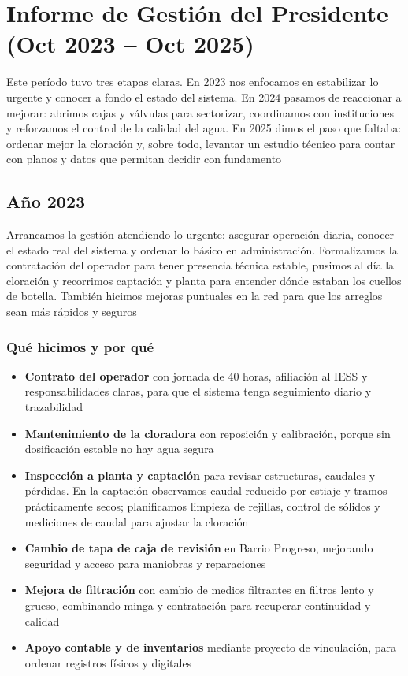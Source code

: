 \chapter{Informe de Gestión del Presidente (Oct 2023 -- Oct 2025)}

Este período tuvo tres etapas claras. En 2023 nos enfocamos en estabilizar lo urgente y conocer a fondo el estado del sistema. En 2024 pasamos de reaccionar a mejorar: abrimos cajas y válvulas para sectorizar, coordinamos con instituciones y reforzamos el control de la calidad del agua. En 2025 dimos el paso que faltaba: ordenar mejor la cloración y, sobre todo, levantar un estudio técnico para contar con planos y datos que permitan decidir con fundamento

\section{Año 2023}

Arrancamos la gestión atendiendo lo urgente: asegurar operación diaria, conocer el estado real del sistema y ordenar lo básico en administración. Formalizamos la contratación del operador para tener presencia técnica estable, pusimos al día la cloración y recorrimos captación y planta para entender dónde estaban los cuellos de botella. También hicimos mejoras puntuales en la red para que los arreglos sean más rápidos y seguros

\subsection*{Qué hicimos y por qué}
\begin{itemize}[noitemsep, topsep=0pt]
  \item \textbf{Contrato del operador} con jornada de 40 horas, afiliación al IESS y responsabilidades claras, para que el sistema tenga seguimiento diario y trazabilidad
  \item \textbf{Mantenimiento de la cloradora} con reposición y calibración, porque sin dosificación estable no hay agua segura
  \item \textbf{Inspección a planta y captación} para revisar estructuras, caudales y pérdidas. En la captación observamos caudal reducido por estiaje y tramos prácticamente secos; planificamos limpieza de rejillas, control de sólidos y mediciones de caudal para ajustar la cloración
  \item \textbf{Cambio de tapa de caja de revisión} en Barrio Progreso, mejorando seguridad y acceso para maniobras y reparaciones
  \item \textbf{Mejora de filtración} con cambio de medios filtrantes en filtros lento y grueso, combinando minga y contratación para recuperar continuidad y calidad
  \item \textbf{Apoyo contable y de inventarios} mediante proyecto de vinculación, para ordenar registros físicos y digitales
\end{itemize}

